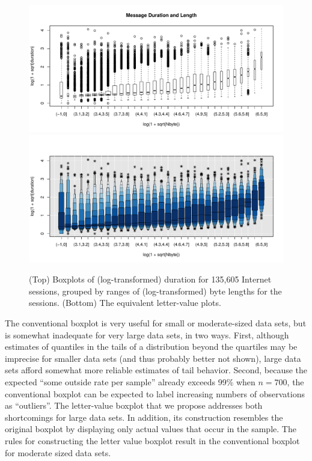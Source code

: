 \documentclass[oneside]{article}
\begin{document}

\begin{figure}[hbtp]
  \centering
  \includegraphics[width=\linewidth]{box2}
  \includegraphics[width=\linewidth]{lvbox2}

  \caption{(Top) Boxplots of (log-transformed) duration for 135,605 Internet
  sessions, grouped by ranges of (log-transformed) byte lengths for the
  sessions. (Bottom) The equivalent letter-value plots.}

  \label{kkewbox} 
\end{figure}

The conventional boxplot is very useful for small or moderate-sized data sets, but is somewhat inadequate for very large data sets, in two ways. First, although estimates of quantiles in the tails of a distribution beyond the quartiles may be imprecise for smaller data sets (and thus probably better not shown), large data sets afford somewhat more reliable estimates of tail behavior. Second, because the expected ``some outside rate per sample'' already exceeds 99\% when $n = 700$, the conventional boxplot can be expected to label increasing numbers of observations as ``outliers''. The letter-value boxplot that we propose addresses both shortcomings for large data sets. In addition, its construction resembles the original boxplot by displaying only actual values that occur in the sample. The rules for constructing the letter value boxplot result in the conventional boxplot for moderate sized data sets.
\end{document}

